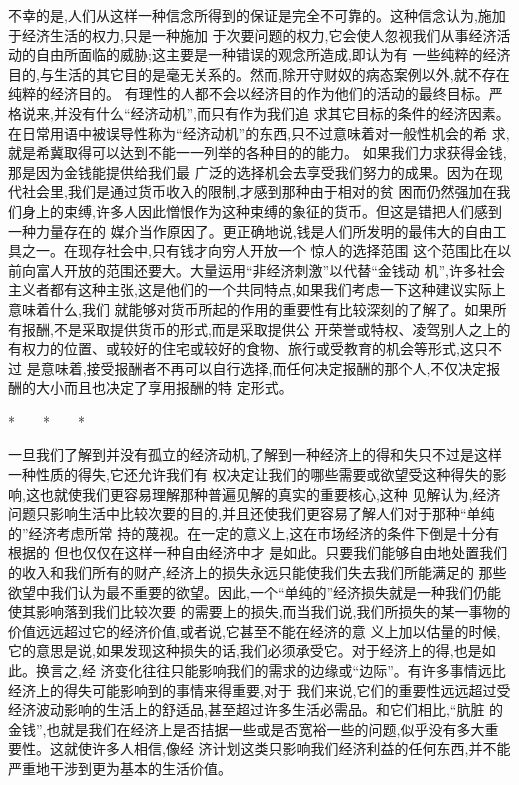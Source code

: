 ﻿\documentclass[12pt]{article}
\begin{document}
不幸的是,人们从这样一种信念所得到的保证是完全不可靠的。这种信念认为,施加于经济生活的权力,只是一种施加
于次要问题的权力,它会使人忽视我们从事经济活动的自由所面临的威胁;这主要是一种错误的观念所造成,即认为有
一些纯粹的经济目的,与生活的其它目的是毫无关系的。然而,除开守财奴的病态案例以外,就不存在纯粹的经济目的。
有理性的人都不会以经济目的作为他们的活动的最终目标。严格说来,并没有什么``经济动机'',而只有作为我们追
求其它目标的条件的经济因素。在日常用语中被误导性称为``经济动机''的东西,只不过意味着对一般性机会的希
求,就是希冀取得可以达到不能一一列举的各种目的的能力。 如果我们力求获得金钱,那是因为金钱能提供给我们最
广泛的选择机会去享受我们努力的成果。因为在现代社会里,我们是通过货币收入的限制,才感到那种由于相对的贫
困而仍然强加在我们身上的束缚,许多人因此憎恨作为这种束缚的象征的货币。但这是错把人们感到一种力量存在的
媒介当作原因了。更正确地说,钱是人们所发明的最伟大的自由工具之一。在现存社会中,只有钱才向穷人开放一个
惊人的选择范围 \myrule 这个范围比在以前向富人开放的范围还要大。大量运用``非经济刺激''以代替``金钱动
机'',许多社会主义者都有这种主张,这是他们的一个共同特点,如果我们考虑一下这种建议实际上意味着什么,我们
就能够对货币所起的作用的重要性有比较深刻的了解了。如果所有报酬,不是采取提供货币的形式,而是采取提供公
开荣誉或特权、凌驾别人之上的有权力的位置、或较好的住宅或较好的食物、旅行或受教育的机会等形式,这只不过
是意味着,接受报酬者不再可以自行选择,而任何决定报酬的那个人,不仅决定报酬的大小而且也决定了享用报酬的特
定形式。

*　　*　　*

一旦我们了解到并没有孤立的经济动机,了解到一种经济上的得和失只不过是这样一种性质的得失,它还允许我们有
权决定让我们的哪些需要或欲望受这种得失的影响,这也就使我们更容易理解那种普遍见解的真实的重要核心,这种
见解认为,经济问题只影响生活中比较次要的目的,并且还使我们更容易了解人们对于那种``单纯的''经济考虑所常
持的蔑视。在一定的意义上,这在市场经济的条件下倒是十分有根据的 \myrule 但也仅仅在这样一种自由经济中才
是如此。只要我们能够自由地处置我们的收入和我们所有的财产,经济上的损失永远只能使我们失去我们所能满足的
那些欲望中我们认为最不重要的欲望。因此,一个``单纯的''经济损失就是一种我们仍能使其影响落到我们比较次要
的需要上的损失,而当我们说,我们所损失的某一事物的价值远远超过它的经济价值,或者说,它甚至不能在经济的意
义上加以估量的时候,它的意思是说,如果发现这种损失的话,我们必须承受它。对于经济上的得,也是如此。换言之,经
济变化往往只能影响我们的需求的边缘或``边际''。有许多事情远比经济上的得失可能影响到的事情来得重要,对于
我们来说,它们的重要性远远超过受经济波动影响的生活上的舒适品,甚至超过许多生活必需品。和它们相比,``肮脏
的金钱'',也就是我们在经济上是否拮据一些或是否宽裕一些的问题,似乎没有多大重要性。这就使许多人相信,像经
济计划这类只影响我们经济利益的任何东西,并不能严重地干涉到更为基本的生活价值。
\end{document}
